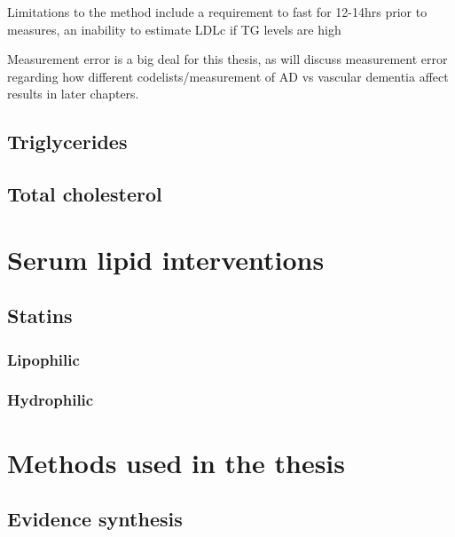 \documentclass[a4paper, twoside]{templates/ociamthesis}
\begin{document}
Limitations to the method include a requirement to fast for 12-14hrs prior to measures, an inability to estimate LDLc if TG levels are high

\begin{correction}
Measurement error is a big deal for this thesis, as will discuss
measurement error regarding how different codelists/measurement of AD vs
vascular dementia affect results in later chapters.
\end{correction}

\hypertarget{triglycerides}{%
\subsection{Triglycerides}\label{triglycerides}}

\hypertarget{total-cholesterol}{%
\subsection{Total cholesterol}\label{total-cholesterol}}

\hypertarget{serum-lipid-interventions}{%
\section{Serum lipid interventions}\label{serum-lipid-interventions}}

\hypertarget{statins}{%
\subsection{Statins}\label{statins}}

\hypertarget{lipophilic}{%
\subsubsection{Lipophilic}\label{lipophilic}}

\hypertarget{hydrophilic}{%
\subsubsection{Hydrophilic}\label{hydrophilic}}

\hypertarget{methods-used-in-the-thesis}{%
\section{Methods used in the thesis}\label{methods-used-in-the-thesis}}

\hypertarget{evidence-synthesis}{%
\subsection{Evidence synthesis}\label{evidence-synthesis}}
\end{document}
